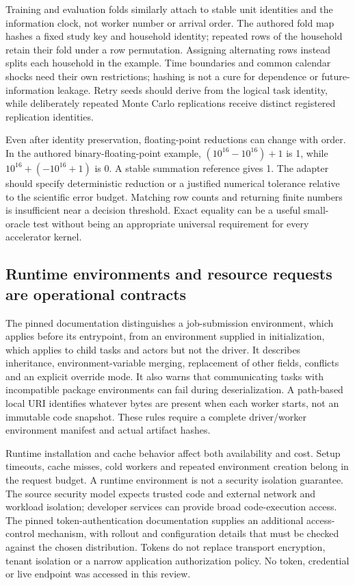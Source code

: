 Training and evaluation folds similarly attach to stable unit identities and the information clock, not worker number or arrival order. The authored fold map hashes a fixed study key and household identity; repeated rows of the household retain their fold under a row permutation. Assigning alternating rows instead splits each household in the example. Time boundaries and common calendar shocks need their own restrictions; hashing is not a cure for dependence or future-information leakage. Retry seeds should derive from the logical task identity, while deliberately repeated Monte Carlo replications receive distinct registered replication identities.

Even after identity preservation, floating-point reductions can change with order. In the authored binary-floating-point example, $(10^{16}-10^{16})+1$ is 1, while $10^{16}+(-10^{16}+1)$ is 0. A stable summation reference gives 1. The adapter should specify deterministic reduction or a justified numerical tolerance relative to the scientific error budget. Matching row counts and returning finite numbers is insufficient near a decision threshold. Exact equality can be a useful small-oracle test without being an appropriate universal requirement for every accelerator kernel.~\citep{exec24_ray_contract}

\subsection{Runtime environments and resource requests are operational contracts}
The pinned documentation distinguishes a job-submission environment, which applies before its entrypoint, from an environment supplied in initialization, which applies to child tasks and actors but not the driver. It describes inheritance, environment-variable merging, replacement of other fields, conflicts and an explicit override mode. It also warns that communicating tasks with incompatible package environments can fail during deserialization. A path-based local URI identifies whatever bytes are present when each worker starts, not an immutable code snapshot. These rules require a complete driver/worker environment manifest and actual artifact hashes.~\citep{exec24_ray_sources}

Runtime installation and cache behavior affect both availability and cost. Setup timeouts, cache misses, cold workers and repeated environment creation belong in the request budget. A runtime environment is not a security isolation guarantee. The source security model expects trusted code and external network and workload isolation; developer services can provide broad code-execution access. The pinned token-authentication documentation supplies an additional access-control mechanism, with rollout and configuration details that must be checked against the chosen distribution. Tokens do not replace transport encryption, tenant isolation or a narrow application authorization policy. No token, credential or live endpoint was accessed in this review.~\citep{exec24_ray_sources}

